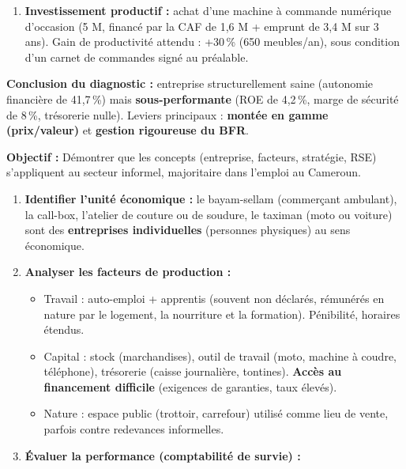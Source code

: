 \documentclass[11pt]{article}
\newcommand{\cle}[1]{{\popxbold\color{popdark}#1}}
\begin{document}
\begin{exoresolu}
\begin{enumerate}
\begin{enumerate}
                  \item \textbf{Investissement productif :} achat d'une machine à commande numérique d'occasion (5 M, financé par la CAF de 1,6 M + emprunt de 3,4 M sur 3 ans). Gain de productivité attendu : +30\,\% (650 meubles/an), sous condition d'un carnet de commandes signé au préalable.
              \end{enumerate}
    \end{enumerate}
    \textbf{Conclusion du diagnostic :} entreprise structurellement saine (autonomie financière de 41,7\,\%) mais \textbf{sous-performante} (ROE de 4,2\,\%, marge de sécurité de 8\,\%, trésorerie nulle). Leviers principaux : \textbf{montée en gamme (prix/valeur)} et \textbf{gestion rigoureuse du BFR}.
\end{exoresolu}

\begin{methode}
    \textbf{Objectif :} Démontrer que les concepts (entreprise, facteurs, stratégie, RSE) s'appliquent au secteur informel, majoritaire dans l'emploi au Cameroun.
    \begin{enumerate}
        \item \textbf{Identifier l'unité économique :} le \cle{bayam-sellam} (commerçant ambulant), la \cle{call-box}, l'\cle{atelier de couture ou de soudure}, le \cle{taximan} (moto ou voiture) sont des \textbf{entreprises individuelles} (personnes physiques) au sens économique.
        \item \textbf{Analyser les facteurs de production :}
              \begin{itemize}
                  \item \cle{Travail} : auto-emploi + apprentis (souvent non déclarés, rémunérés en nature par le logement, la nourriture et la formation). Pénibilité, horaires étendus.
                  \item \cle{Capital} : stock (marchandises), outil de travail (moto, machine à coudre, téléphone), trésorerie (caisse journalière, tontines). \textbf{Accès au financement difficile} (exigences de garanties, taux élevés).
                  \item \cle{Nature} : espace public (trottoir, carrefour) utilisé comme lieu de vente, parfois contre redevances informelles.
              \end{itemize}
        \item \textbf{Évaluer la performance (comptabilité de survie) :}
              \begin{itemize}

\end{itemize}
\end{enumerate}
\end{methode}
\end{document}
